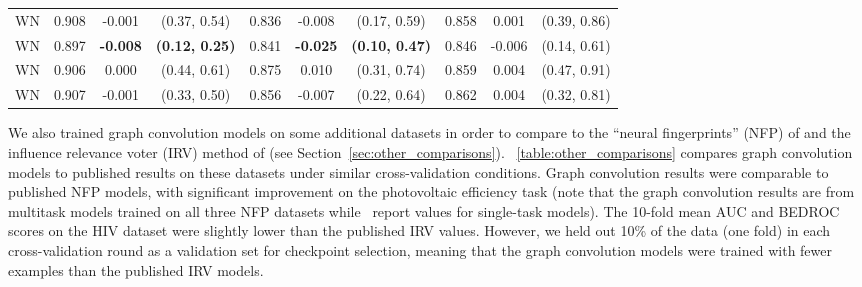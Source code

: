 {\begin{landscape}
\begin{table}[htb]
\begin{tabular}{ l S S c S S c S S c }
    WN & 0.908 & -0.001 & (\num{0.37}, \num{0.54}) & 0.836 & -0.008 & (\num{0.17}, \num{0.59}) & 0.858 & 0.001 & (\num{0.39}, \num{0.86}) \\
    WN & 0.897 & \bfseries \color{red} -0.008 & \bfseries \color{red} (\num{0.12}, \num{0.25}) & 0.841 & \bfseries \color{red} -0.025 & \bfseries \color{red} (\num{0.10}, \num{0.47}) & 0.846 & -0.006 & (\num{0.14}, \num{0.61}) \\
    WN & 0.906 & 0.000 & (\num{0.44}, \num{0.61}) & 0.875 & 0.010 & (\num{0.31}, \num{0.74}) & 0.859 & 0.004 & (\num{0.47}, \num{0.91}) \\
    WN & 0.907 & -0.001 & (\num{0.33}, \num{0.50}) & 0.856 & -0.007 & (\num{0.22}, \num{0.64}) & 0.862 & 0.004 & (\num{0.32}, \num{0.81}) \\
    \bottomrule
    \end{tabular}
\end{table}
\vspace*{\fill}
\end{landscape}
}

We also trained graph convolution models on some additional datasets in order to
compare to the ``neural fingerprints'' (NFP) of
\citet{duvenaud2015convolutional} and the influence relevance voter (IRV) method
of \citet{swamidass2009influence} (see Section~\ref{sec:other_comparisons}).
\tablename~\ref{table:other_comparisons} compares graph convolution models to
published results on these datasets under similar cross-validation conditions.
Graph convolution results were comparable to published NFP models, with
significant improvement on the photovoltaic efficiency task (note that the graph
convolution results are from multitask models trained on all three NFP datasets
while~\citet{duvenaud2015convolutional} report values for single-task models).
The 10-fold mean AUC and BEDROC scores on the HIV dataset were slightly lower than the published
IRV values. However, we held out 10\% of the data (one fold) in each
cross-validation round as a validation set for checkpoint selection, meaning
that the graph convolution models were trained with fewer examples than the
published IRV models.

